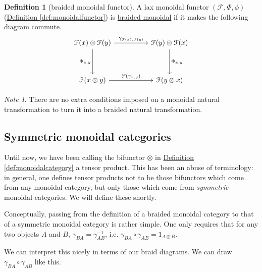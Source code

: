 \documentclass[a4paper,10pt]{scrreprt}
\newcommand{\defn}[1]{\ul{#1}}
\theoremstyle{definition}
\newtheorem{definition}{Definition}[section]
\theoremstyle{plain}
\theoremstyle{remark}
\newtheorem{note}{Note}[section]
\begin{document}
\begin{definition}[braided monoidal functor]
  \label{def:braidedmonoidalfunctor}
  A lax monoidal functor $(\mathcal{F}, \Phi, \phi)$ (\hyperref[def:monoidalfunctor]{Definition \ref*{def:monoidalfunctor}}) is \defn{braided monoidal} if it makes the following diagram commute.
  \begin{equation*}
    \begin{tikzcd}[row sep=huge, column sep=huge]
      \mathcal{F}(x) \otimes \mathcal{F}(y)
      \arrow[r, "{\gamma_{\mathcal{F}(x), \mathcal{F}(y)}}"]
      \arrow[d, swap, "{\Phi_{x,  y}}"]
      & \mathcal{F}(y) \otimes \mathcal{F}(x)
      \arrow[d, "{\Phi_{x, y}}"]
      \\
      \mathcal{F}(x \otimes y)
      \arrow[r, "{\mathcal{F}(\gamma_{x, y})}"]
      & \mathcal{F}(y \otimes x)
    \end{tikzcd}
  \end{equation*}
  \begin{note}
    There are no extra conditions imposed on a monoidal natural transformation to turn it into a braided natural transformation. 
  \end{note}
\end{definition}

\subsection{Symmetric monoidal categories}
Until now, we have been calling the bifunctor $\otimes$ in \hyperref[def:monoidalcategory]{Definition \ref*{def:monoidalcategory}} a tensor product. This has been an abuse of terminology: in general, one defines tensor products not to be those bifunctors which come from any monoidal category, but only those which come from \emph{symmetric} monoidal categories. We will define these shortly.

Conceptually, passing from the definition of a braided monoidal category to that of a symmetric monoidal category is rather simple. One only requires that for any two objects $A$ and $B$, $\gamma_{BA} = \gamma_{AB}^{-1}$, i.e. $\gamma_{BA} \circ \gamma_{AB} = 1_{A \otimes B}$.

We can interpret this nicely in terms of our braid diagrams. We can draw $\gamma_{BA} \circ \gamma_{AB}$ like this.

\begin{center}
\end{center}
\end{document}
